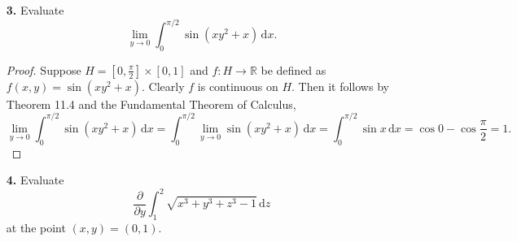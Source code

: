 \documentclass[ 12pt ]{article}
\begin{document}
\begin{enumerate}
		\begin{proof}
			Suppose $f : \mathbb{R}^2 \to \mathbb{R}$ is defined as above. For $(x, y) \neq \textbf{0}$, we have $$\frac{\partial f}{\partial x} = \frac{\partial}{\partial x}
			\left ( \frac{x^4 + y^4}{x^2 + y^2} \right ) = \frac{2x^5 + 4x^3y^2 - 2xy^4}{(x^2 + y^2)^2}.$$ Otherwise, if $(x, y) = \textbf{0}$, then $$\frac{\partial f}{\partial x}(0, 0)
			= \lim_{h \to 0} \frac{f(h, 0) - f(0, 0)}{h} = \lim_{h \to 0} \frac{h^2}{h} = 0.$$ Provided that  \[ \frac{\partial f}{\partial x}( x, y ) = \begin{cases}
			\frac{2x^5 + 4x^3y^2 - 2xy^4}{(x^2 + y^2)^2}; & (x, y) \neq \textbf{0} \\ 0; & (x, y) = \textbf{0} \end{cases} \] we can see that $\partial f / \partial x$ is continuous on
			$\mathbb{R}^2 \setminus \{ \textbf{0} \}$ with $\textbf{0}$ in question. Furthermore, observe that $$\left | \frac{2x^5 + 4x^3y^2 - 2xy^4}{(x^2 + y^2)^2} \right | = 2|x|
			\frac{|x^4 + 2x^2y^2 - y^4|}{(x^2 + y^2)^2} \leq 2|x| \frac{|x^4| + 2|x^2y^2| + |y^4|}{(x^2 + y^2)^2} = 2|x| \frac{(x^2 + y^2)^2}{(x^2 + y^2)^2} = 2|x| \to 0$$ as $(x, y)
			\to \textbf{0}$ and so $$\frac{2x^5 + 4x^3y^2 - 2xy^4}{(x^2 + y^2)^2} \to 0 = \frac{\partial f}{\partial x}(0, 0)$$ as $(x, y) \to \textbf{0}$ by the Squeeze Theorem. Thus,
			$\partial f / \partial x$ is continuous on $\mathbb{R}^2$.
		\end{proof}
		\newpage


	\item[\textbf{3.}] Evaluate $$\lim_{y \to 0} \int_0^{\pi/2} \sin( xy^2 + x )\, \mathrm{d}x.$$

		\begin{proof}
			Suppose $H = \left [0, \frac{\pi}{2} \right ] \times [0, 1]$ and $f : H \to \mathbb{R}$ be defined as $f(x, y) = \sin( xy^2 + x )$. Clearly $f$ is continuous on $H$.
			Then it follows by Theorem 11.4 and the Fundamental Theorem of Calculus, $$\lim_{y \to 0} \int_0^{\pi / 2} \sin ( xy^2 + x )\, \mathrm{d}x = \int_0^{\pi / 2} \lim_{y \to 0}
			\sin ( xy^2 + x )\, \mathrm{d}x = \int_0^{\pi / 2} \sin x\, \mathrm{d}x = \cos 0 - \cos \frac{\pi}{2} = 1.$$
		\end{proof}


	\item[\textbf{4.}] Evaluate $$\frac{\partial}{\partial y} \int_1^2 \sqrt{x^3 + y^3 + z^3 - 1}\, \mathrm{d}z$$ at the point $(x, y) = (0, 1)$.


\end{enumerate}
\end{document}
